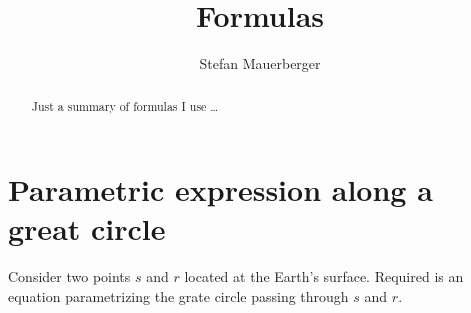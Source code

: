 \documentclass{article}
\title{Formulas}
\author{Stefan Mauerberger}
\begin{document}
\maketitle
\begin{abstract}
    Just a summary of formulas I use \dots
\end{abstract}

\section{Parametric expression along a great circle}

Consider two points $s$ and $r$ located at the Earth's surface.
Required is an equation parametrizing the grate circle passing through $s$ and $r$.
\end{document}
